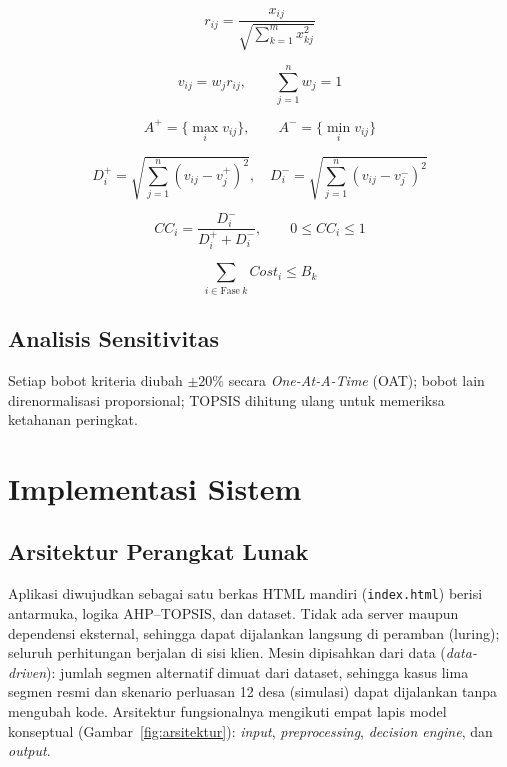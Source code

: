 \documentclass[10pt,twocolumn,a4paper]{article}
\begin{document}
\begin{equation}
r_{ij}=\frac{x_{ij}}{\sqrt{\sum_{k=1}^{m}x_{kj}^{2}}}
\label{eq:norm}
\end{equation}

\begin{equation}
v_{ij}=w_j r_{ij},\qquad \sum_{j=1}^{n} w_j = 1
\label{eq:w}
\end{equation}

\begin{equation}
A^{+}=\{\max_i v_{ij}\},\qquad A^{-}=\{\min_i v_{ij}\}
\label{eq:ideal}
\end{equation}

\begin{equation}
D_i^{+}=\sqrt{\sum_{j=1}^{n}(v_{ij}-v_j^{+})^2},\quad D_i^{-}=\sqrt{\sum_{j=1}^{n}(v_{ij}-v_j^{-})^2}
\label{eq:dist}
\end{equation}

\begin{equation}
CC_i=\frac{D_i^{-}}{D_i^{+}+D_i^{-}},\qquad 0\le CC_i\le 1
\label{eq:cc}
\end{equation}

\begin{equation}
\sum_{i\in \mathrm{Fase}\ k} Cost_i \le B_k
\label{eq:budget}
\end{equation}

\subsection{Analisis Sensitivitas}
Setiap bobot kriteria diubah $\pm20\%$ secara \textit{One-At-A-Time} (OAT); bobot lain direnormalisasi proporsional; TOPSIS dihitung ulang untuk memeriksa ketahanan peringkat.

\section{Implementasi Sistem}

\subsection{Arsitektur Perangkat Lunak}
Aplikasi diwujudkan sebagai satu berkas HTML mandiri (\texttt{index.html}) berisi antarmuka, logika AHP--TOPSIS, dan dataset. Tidak ada server maupun dependensi eksternal, sehingga dapat dijalankan langsung di peramban (luring); seluruh perhitungan berjalan di sisi klien. Mesin dipisahkan dari data (\textit{data-driven}): jumlah segmen alternatif dimuat dari dataset, sehingga kasus lima segmen resmi dan skenario perluasan 12 desa (simulasi) dapat dijalankan tanpa mengubah kode. Arsitektur fungsionalnya mengikuti empat lapis model konseptual (Gambar~\ref{fig:arsitektur}): \textit{input}, \textit{preprocessing}, \textit{decision engine}, dan \textit{output}.
\end{document}
